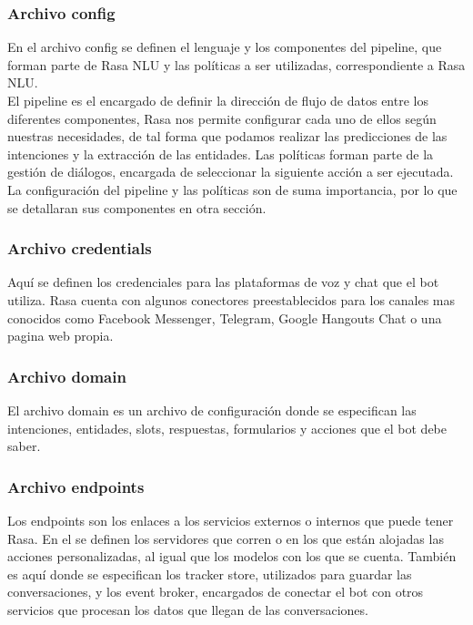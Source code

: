 \subsubsection{Archivo config}
En el archivo config se definen el lenguaje y los componentes del pipeline, que forman parte de Rasa NLU y las políticas a ser utilizadas, correspondiente a Rasa NLU.\\
El pipeline es el encargado de definir la dirección de flujo de datos entre los diferentes componentes, Rasa nos permite configurar cada uno de ellos según nuestras necesidades, de tal forma que podamos realizar las predicciones de las intenciones y la extracción de las entidades. Las políticas forman parte de la gestión de diálogos, encargada de seleccionar la siguiente acción a ser ejecutada. \cite{Configuration_Documentation}
La configuración del pipeline y las políticas son de suma importancia, por lo que se detallaran sus componentes en otra sección.
\subsubsection{Archivo credentials}
Aquí se definen los credenciales para las plataformas de voz y chat que el bot utiliza. Rasa cuenta con algunos conectores preestablecidos para los canales mas conocidos como Facebook Messenger, Telegram, Google Hangouts Chat o una pagina web propia. \cite{Credentials_Documentation}
\subsubsection{Archivo domain}
El archivo domain es un archivo de configuración donde se especifican las intenciones, entidades, slots, respuestas, formularios y acciones que el bot debe saber. \cite{Domain_Documentation}
\subsubsection{Archivo endpoints}
Los endpoints son los enlaces a los servicios externos o internos que puede tener Rasa. En el se definen los servidores que corren o en los que están alojadas las acciones personalizadas, al igual que los modelos con los que se cuenta. También es aquí donde se especifican los tracker store, utilizados para guardar las conversaciones, y los event broker, encargados de conectar el bot con otros servicios que procesan los datos que llegan de las conversaciones.
